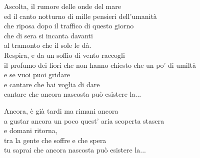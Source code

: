 
\strofa Ascolta, il rumore delle onde del mare\\
ed il canto notturno di mille pensieri dell'umanità\\
che riposa dopo il traffico di questo giorno\\
che di sera si incanta davanti\\
al tramonto che il sole le dà.\\
Respira, e da un soffio di vento raccogli\\
il profumo dei fiori che non hanno chiesto che un po' di umiltà\\
e se vuoi puoi gridare\\
e cantare che hai voglia di dare\\
cantare che ancora nascosta può esistere la...

\spazio


\spazio

\strofa Ancora, è già tardi ma rimani ancora\\
a gustar ancora un poco quest' aria scoperta stasera\\
e domani ritorna,\\
tra la gente che soffre e che spera\\
tu saprai che ancora nascosta può esistere la...

\spazio

